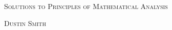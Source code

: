 \documentclass[dvipsnames,svgnames,x11names]{scrbook}%
\begin{document}
\pagecolor{PaleGreen1}
\begin{center}
  \begin{center}
  \vspace*{\fill}
  \textsc{\LARGE Solutions to Principles of Mathematical Analysis}
  \bigskip

  \textsc{\LARGE Dustin Smith}
  \vspace*{\fill}
\end{center}
\end{center}

\newpage

\tableofcontents

\newpage








\end{document}

